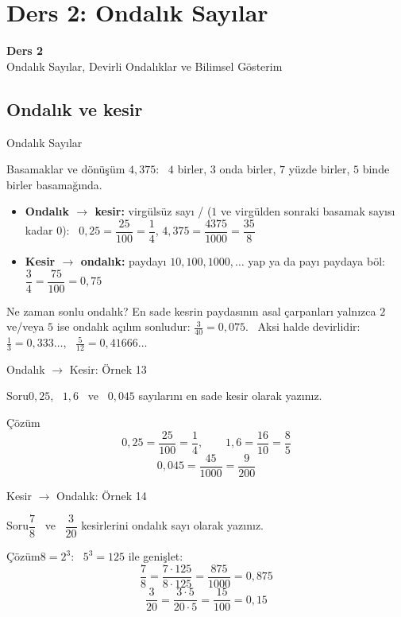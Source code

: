 \documentclass[aspectratio=169,11pt]{beamer}
\newcommand{\soru}[3]{%
\begin{frame}{#1}
  \begin{block}{Soru}\large #2\end{block}
  \pause
  \begin{exampleblock}{Çözüm}\large #3\end{exampleblock}
\end{frame}}
\begin{document}
\section{Ders 2: Ondalık Sayılar}
\begin{frame}
\centering\Large\color{anamavi}\textbf{Ders 2}\\[6pt]\normalsize Ondalık Sayılar, Devirli Ondalıklar ve Bilimsel Gösterim
\end{frame}

\subsection{Ondalık ve kesir}
\begin{frame}{Ondalık Sayılar}
\begin{block}{Basamaklar ve dönüşüm}
\(4{,}375\): \ \(4\) birler, \(3\) onda birler, \(7\) yüzde birler, \(5\) binde birler basamağında.
\begin{itemize}
\item \textbf{Ondalık \(\to\) kesir:} virgülsüz sayı / (\(1\) ve virgülden sonraki basamak sayısı kadar \(0\)):
\ \(0{,}25=\dfrac{25}{100}=\dfrac{1}{4}\), \quad \(4{,}375=\dfrac{4375}{1000}=\dfrac{35}{8}\)
\item \textbf{Kesir \(\to\) ondalık:} paydayı \(10,100,1000,\dots\) yap ya da payı paydaya böl: \ \(\dfrac{3}{4}=\dfrac{75}{100}=0{,}75\)
\end{itemize}
\end{block}
\begin{alertblock}{Ne zaman sonlu ondalık?}
En sade kesrin paydasının asal çarpanları yalnızca \(2\) ve/veya \(5\) ise ondalık açılım sonludur:
\(\frac{3}{40}=0{,}075\). \ Aksi halde devirlidir: \(\frac{1}{3}=0{,}333\ldots\), \ \(\frac{5}{12}=0{,}41666\ldots\)
\end{alertblock}
\end{frame}

\soru{Ondalık \(\to\) Kesir: Örnek 13}
{\(0{,}25\), \ \(1{,}6\) \ ve \ \(0{,}045\) sayılarını en sade kesir olarak yazınız.}
{\[0{,}25=\frac{25}{100}=\frac{1}{4},\qquad 1{,}6=\frac{16}{10}=\frac{8}{5}\]
\[0{,}045=\frac{45}{1000}=\frac{9}{200}\]}

\soru{Kesir \(\to\) Ondalık: Örnek 14}
{\(\dfrac{7}{8}\) \ ve \ \(\dfrac{3}{20}\) kesirlerini ondalık sayı olarak yazınız.}
{\(8=2^3\): \ \(5^3=125\) ile genişlet:
\[\frac{7}{8}=\frac{7\cdot 125}{8\cdot 125}=\frac{875}{1000}=0{,}875\]
\[\frac{3}{20}=\frac{3\cdot 5}{20\cdot 5}=\frac{15}{100}=0{,}15\]}
\end{document}
